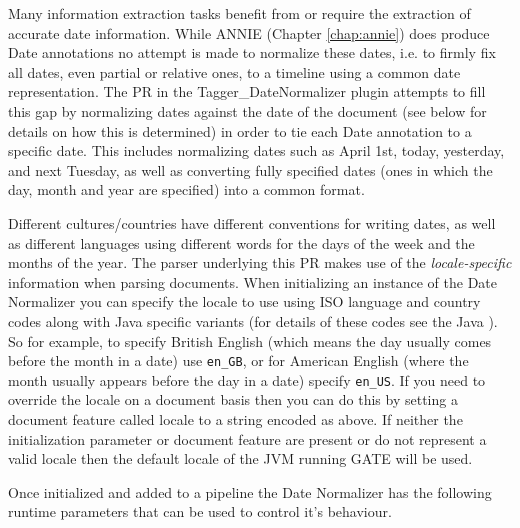 
Many information extraction tasks benefit from or require the extraction of
accurate date information. While ANNIE (Chapter \ref{chap:annie}) does produce
Date annotations no attempt is made to normalize these dates, i.e. to firmly
fix all dates, even partial or relative ones, to a timeline using a common
date representation. The PR in the Tagger\_DateNormalizer plugin attempts
to fill this gap by normalizing dates against the date of the document (see
below for details on how this is determined) in order to tie each Date
annotation to a specific date. This includes normalizing dates such as
April 1st, today, yesterday, and next Tuesday, as well as converting
fully specified dates (ones in which the day, month and year are
specified) into a common format.

Different cultures/countries have different conventions for writing dates, as
well as different languages using different words for the days of the week and
the months of the year. The parser underlying this PR makes use of the
\textit{locale-specific} information when parsing documents. When initializing
an instance of the Date Normalizer you can specify the locale to use using
ISO language and country codes along with Java specific variants (for details
of these codes see the Java
).
So for example, to specify British English (which means the day usually comes
before the month in a date) use \texttt{en\_GB}, or for American English (where
the month usually appears before the day in a date) specify \texttt{en\_US}.
If you need to override the locale on a document basis then you can do this by
setting a document feature called locale to a string encoded as above. If neither
the initialization parameter or document feature are present or do not represent
a valid locale then the default locale of the JVM running GATE will be used.

Once initialized and added to a pipeline the Date Normalizer has the following
runtime parameters that can be used to control it's behaviour.

